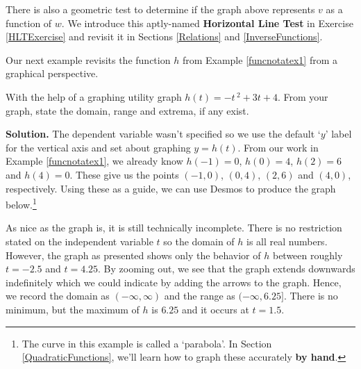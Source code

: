 \documentclass{ximera}
\begin{document}
\begin{center}
\end{center}


There is also a geometric test to determine if the graph above represents $v$ as a function of $w$.  We introduce this aptly-named  \textbf{Horizontal Line Test} in Exercise \ref{HLTExercise} and revisit it in Sections \ref{Relations} and \ref{InverseFunctions}.  

 

Our next example revisits the function $h$ from Example \ref{funcnotatex1} from a graphical perspective.

\begin{example} \label{graphalgebraicex}  With the help of a graphing utility graph $h(t) = -t\,^{2} + 3t + 4$.  From your graph, state the domain, range and extrema, if any exist.

{\bf Solution.} The dependent variable wasn't specified so we use the default `$y$' label for the vertical axis and set about graphing $y = h(t)$.   From our work in Example \ref{funcnotatex1},  we already know  $h(-1) = 0$, $h(0) = 4$, $h(2) = 6$ and $h(4) = 0$.  These give us the points $(-1,0)$, $(0,4)$, $(2,6)$ and $(4,0)$, respectively.  Using these as a guide, we can use  Desmos to produce the graph below.\footnote{The curve in this example is called a 	`parabola'.  In Section \ref{QuadraticFunctions}, we'll learn how to graph these accurately \textbf{by hand}.}

\begin{center}
\end{center}


 As nice as the graph is, it is still technically incomplete.  There is no restriction stated on the independent variable $t$ so the domain of $h$ is all real numbers. However, the graph as presented shows only the behavior of $h$ between roughly $t = -2.5$ and $t = 4.25$.  By zooming out, we see that the graph extends downwards indefinitely which we could indicate by adding the arrows to the graph.  Hence, we record the domain as $(-\infty, \infty)$ and the range as $(-\infty, 6.25]$.  There is no minimum, but the  maximum of $h$ is $6.25$ and it occurs at $t = 1.5$. 




\end{example}
\end{document}
